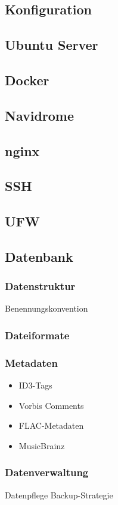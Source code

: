 \documentclass[12pt,a4paper]{report}
\begin{document}
\subsection{Konfiguration}
  \subsection{Ubuntu Server}
  \subsection{Docker}
  \subsection{Navidrome}
  \subsection{nginx}
  \subsection{SSH}
  \subsection{UFW}
\subsection{Datenbank}
  \subsubsection{Datenstruktur}
    Benennungskonvention
  \subsubsection{Dateiformate}
  \subsubsection{Metadaten}
    \begin{itemize}
      \item ID3-Tags
      \item Vorbis Comments
      \item FLAC-Metadaten
      \item MusicBrainz
    \end{itemize}
  \subsubsection{Datenverwaltung}
    Datenpflege
    Backup-Strategie
\end{document}
